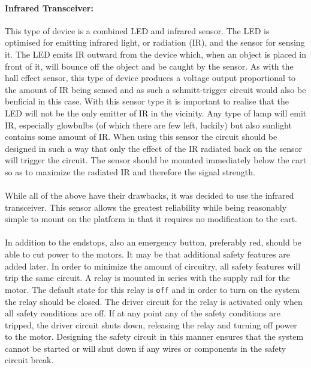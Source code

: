 \paragraph{Infrared Transceiver:} %
\label{par:infrared_transceiver}
This type of device is a combined LED and infrared sensor.
The LED is optimised for emitting infrared light, or radiation (IR), and the sensor for sensing it.
The LED emits IR outward from the device which, when an object is placed in front of it, will bounce off the object and be caught by the sensor.
As with the hall effect sensor, this type of device produces a voltage output proportional to the amount of IR being sensed and as such a schmitt-trigger circuit would also be benficial in this case.
With this sensor type it is important to realise that the LED will not be the only emitter of IR in the vicinity.
Any type of lamp will emit IR, especially glowbulbs (of which there are few left, luckily) but also sunlight contains some amount of IR.
When using this sensor the circuit should be designed in such a way that only the effect of the IR radiated back on the sensor will trigger the circuit.
The sensor should be mounted immediately below the cart so as to maximize the radiated IR and therefore the signal strength.
\\~\\
While all of the above have their drawbacks, it was decided to use the infrared transceiver.
This sensor allows the greatest reliability while being reasonably simple to mount on the platform in that it requires no modification to the cart.
\\~\\
In addition to the endstops, also an emergency button, preferably red, should be able to cut power to the motors.
It may be that additional safety features are added later.
In order to minimize the amount of circuitry, all safety features will trip the same circuit.
A relay is mounted in series with the supply rail for the motor.
The default state for this relay is \texttt{off} and in order to turn on the system the relay should be closed.
The driver circuit for the relay is activated only when all safety conditions are off.
If at any point any of the safety conditions are tripped, the driver circuit shuts down, releasing the relay and turning off power to the motor.
Designing the safety circuit in this manner ensures that the system cannot be started or will shut down if any wires or components in the safety circuit break.

